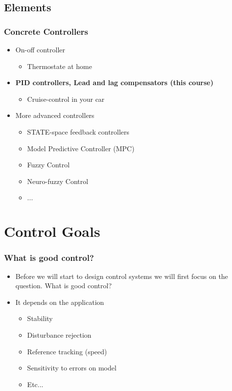 \subsection[Elements]{Elements}
\begin{frame}
	\frametitle{Concrete Controllers}
	\begin{itemize}
		\item On-off controller
		\begin{itemize}
			\item Thermostate at home
		\end{itemize}
		\item \textbf{PID controllers, Lead and lag compensators (this course)}
		\begin{itemize}
			\item Cruise-control in your car
		\end{itemize}
		\item More advanced controllers
		\begin{itemize}
			\item STATE-space feedback controllers
			\item Model Predictive Controller (MPC)
			\item Fuzzy Control
			\item Neuro-fuzzy Control
			\item ...
		\end{itemize}
	\end{itemize}
\end{frame}


\section{Control Goals}
\begin{frame}
	\frametitle{What is good control?}
	\begin{itemize}
		\item Before we will start to design control systems we will first focus on the question. What is good control?
		\item It depends on the application
		\begin{itemize}
			\item Stability
			\item Disturbance rejection
			\item Reference tracking (speed)
			\item Sensitivity to errors on model
			\item Etc...
		\end{itemize}
	\end{itemize}
\end{frame}

